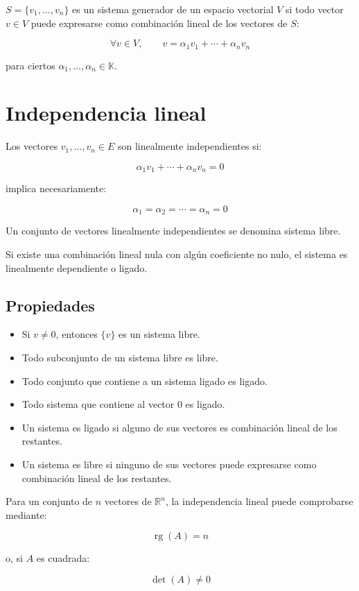 \documentclass[11pt,a4paper]{article}
\newcommand{\R}{\mathbb{R}}
\newcommand{\K}{\mathbb{K}}
\newcommand{\rg}{\operatorname{rg}}
\begin{document}
$S=\{v_1,\ldots,v_n\}$ es un sistema generador de un espacio vectorial $V$ si todo vector $v\in V$ puede expresarse como combinación lineal de los vectores de $S$:

\[
\forall v\in V,
\qquad
v=
\alpha_1v_1+\cdots+\alpha_nv_n
\]

para ciertos $\alpha_1,\ldots,\alpha_n\in\K$.

\section{Independencia lineal}

Los vectores $v_1,\ldots,v_n\in E$ son linealmente independientes si:

\[
\alpha_1v_1+\cdots+\alpha_nv_n=0
\]

implica necesariamente:

\[
\alpha_1=\alpha_2=\cdots=\alpha_n=0
\]

Un conjunto de vectores linealmente independientes se denomina sistema libre.

Si existe una combinación lineal nula con algún coeficiente no nulo, el sistema es linealmente dependiente o ligado.

\subsection{Propiedades}

\begin{itemize}
	\item Si $v\neq0$, entonces $\{v\}$ es un sistema libre.
	\item Todo subconjunto de un sistema libre es libre.
	\item Todo conjunto que contiene a un sistema ligado es ligado.
	\item Todo sistema que contiene al vector $0$ es ligado.
	\item Un sistema es ligado si alguno de sus vectores es combinación lineal de los restantes.
	\item Un sistema es libre si ninguno de sus vectores puede expresarse como combinación lineal de los restantes.
\end{itemize}

Para un conjunto de $n$ vectores de $\R^n$, la independencia lineal puede comprobarse mediante:

\[
\rg(A)=n
\]

o, si $A$ es cuadrada:

\[
\det(A)\neq0
\]
\end{document}
